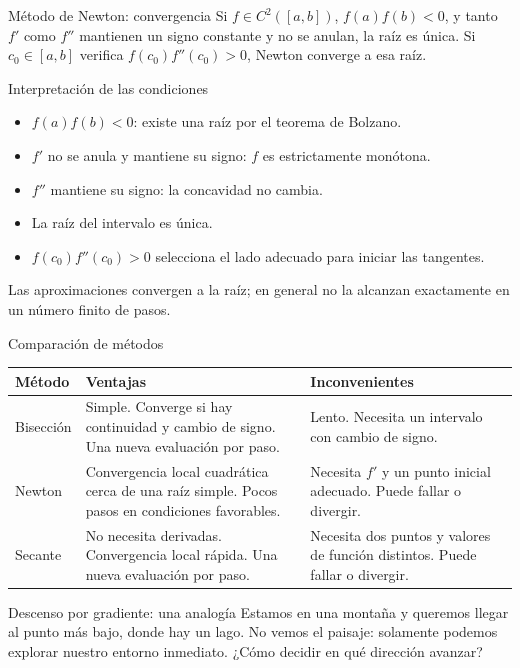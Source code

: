 \documentclass[main.tex]{subfiles}
\begin{document}
\begin{frame}[t]{Método de Newton: convergencia}
\small
Si $f\in C^2([a,b])$, $f(a)f(b)<0$, y tanto $f'$ como $f''$ mantienen un signo constante y no se anulan, la raíz es única.
\medskip
Si $c_0\in[a,b]$ verifica $f(c_0)f''(c_0)>0$, Newton converge a esa raíz.
\end{frame}
\begin{frame}[t]{Interpretación de las condiciones}
\begin{itemize}
\item $f(a)f(b)<0$: existe una raíz por el teorema de Bolzano.
\item $f'$ no se anula y mantiene su signo: $f$ es estrictamente monótona.
\item $f''$ mantiene su signo: la concavidad no cambia.
\item La raíz del intervalo es única.
\item $f(c_0)f''(c_0)>0$ selecciona el lado adecuado para iniciar las tangentes.
\end{itemize}
Las aproximaciones convergen a la raíz; en general no la alcanzan exactamente en un número finito de pasos.
\end{frame}
\begin{frame}[t]{Comparación de métodos}
\scriptsize\setlength{\tabcolsep}{4pt}
\begin{tabular}{|p{}|p{}|p{}|}\hline
\textbf{Método}&\textbf{Ventajas}&\textbf{Inconvenientes}\\\hline
Bisección&Simple. Converge si hay continuidad y cambio de signo. Una nueva evaluación por paso.&Lento. Necesita un intervalo con cambio de signo.\\[5mm]\hline
Newton&Convergencia local cuadrática cerca de una raíz simple. Pocos pasos en condiciones favorables.&Necesita $f'$ y un punto inicial adecuado. Puede fallar o divergir.\\[5mm]\hline
Secante&No necesita derivadas. Convergencia local rápida. Una nueva evaluación por paso.&Necesita dos puntos y valores de función distintos. Puede fallar o divergir.\\[5mm]\hline
\end{tabular}
\end{frame}
\begin{frame}[t]{Descenso por gradiente: una analogía}
Estamos en una montaña y queremos llegar al punto más bajo, donde hay un lago.
\bigskip
No vemos el paisaje: solamente podemos explorar nuestro entorno inmediato.
\bigskip
¿Cómo decidir en qué dirección avanzar?
\end{frame}
\end{document}
